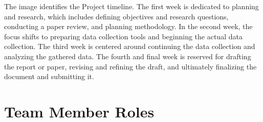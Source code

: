 \documentclass{article}
\begin{document}
    The image identifies the Project timeline. The first week is dedicated to planning and research, which includes defining objectives and research questions, conducting a paper review, and planning methodology. In the second week, the focus shifts to preparing data collection tools and beginning the actual data collection. The third week is centered around continuing the data collection and analyzing the gathered data. The fourth and final week is reserved for drafting the report or paper, revising and refining the draft, and ultimately finalizing the document and submitting it.
\section{Team Member Roles}
\end{document}
